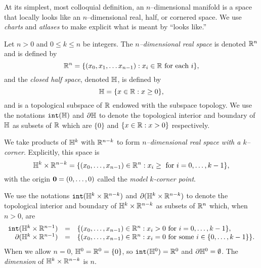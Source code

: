 At its simplest, most colloquial definition, an $n$--dimensional manifold is a space that locally looks like an $n$--dimensional real, half, or cornered space.
We use \emph{charts} and \emph{atlases} to make explicit what is meant by ``looks like.''

%
%

\begin{defn}
	Let $n>0$ and $0\leq k\leq n$ be integers.
	The \emph{$n$--dimensional real space} is denoted $\mathbb{R}^n$ and is defined by
	\[
		\mathbb{R}^n=\{(x_0,x_1,\dots x_{n-1}):x_i\in\mathbb{R}\textrm{ for each }i\},
	\]
	and the \emph{closed half space}, denoted $\mathbb{H}$, is defined by
	\[
		\mathbb{H}=\{x\in\mathbb{R}:x\geq 0\},
	\]
	and is a topological subspace of $\mathbb{R}$ endowed with the subspace topology.
	We use the notations $\mathtt{int}(\mathbb{H})$ and $\partial \mathbb{H}$ to denote the topological interior and boundary of $\mathbb{H}$ as subsets of $\mathbb{R}$ which are $\{0\}$ and $\{x\in\mathbb{R}:x>0\}$ respectively.
	
	We take products of $\mathbb{H}^k$ with $\mathbb{R}^{n-k}$ to form \emph{$n$--dimensional real space with a $k$--corner}.
	Explicitly, this space is
	\[
		\mathbb{H}^k\times\mathbb{R}^{n-k} = \{(x_0,\dots,x_{n-1})\in\mathbb{R}^n:x_i\geq\textrm{ for } i=0,\dots,k-1\},
	\]
	with the origin $\mathbf{0}=(0,\dots,0)$ called the \emph{model $k$-corner point}.
	
	We use the notations $\mathtt{int}(\mathbb{H}^k\times\mathbb{R}^{n-k})$ and $\partial (\mathbb{H}^k\times\mathbb{R}^{n-k})$ to denote the topological interior and boundary of $\mathbb{H}^k\times\mathbb{R}^{n-k}$ as subsets of $\mathbb{R}^n$ which, when $n>0$, are
	\[
	\begin{array}{rcl}
	\mathtt{int}(\mathbb{H}^k\times\mathbb{R}^{n-1}) & = & \{(x_0,\dots,x_{n-1})\in\mathbb{R}^n : x_i > 0\textrm{ for }i=0,\dots,k-1\},\\
	\partial (\mathbb{H}^k\times\mathbb{R}^{n-1})	& = & \{(x_0,\dots,x_{n-1})\in\mathbb{R}^n : x_i = 0\textrm{ for some }i\in\{0,\dots,k-1\}\}.
	\end{array}
	\]
	When we allow $n=0$, $\mathbb{H}^0 = \mathbb{R}^0 = \{0\}$, so $\mathtt{int}(\mathbb{H}^0)=\mathbb{R}^0$ and $\partial\mathbb{H}^0=\emptyset$.
	The \emph{dimension} of $\mathbb{H}^k\times\mathbb{R}^{n-k}$ is $n$.
\end{defn}

